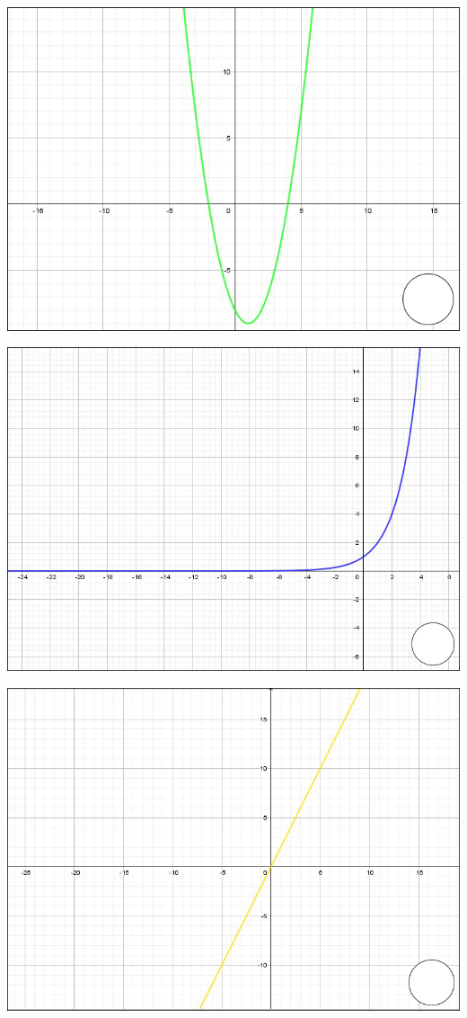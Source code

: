 \documentclass[12pt, addpoints, answers]{exam}
\begin{document}
\begin{questions}
\begin{minipage}[t]{0.23\linewidth}	\includegraphics[width=1\linewidth]{Figuras/fig5}
\end{minipage}\hfill	
\begin{minipage}[t]{0.23\linewidth}
	\includegraphics[width=1\linewidth]{Figuras/fig6}
\end{minipage}\hfill		
\begin{minipage}[t]{0.23\linewidth}
	\includegraphics[width=1\linewidth]{Figuras/fig7}

\end{minipage}
\end{questions}
\end{document}

